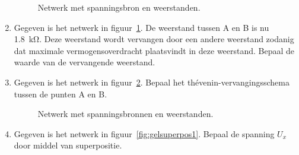 \begin{enumerate}[labelindent=0pt,labelwidth=\widthof{8.88.\ },label=\textbf{\thechapter.\arabic*.},leftmargin=!,ref=\thechapter.\arabic*]
\begin{figure}[!ht]
\centering
{}
\caption{Netwerk met spanningsbron en weerstanden.}
\label{fig:gelnetwerkvoortheveninanalysis2}
\end{figure}



\item
\label{que:gelthevenin2b}
Gegeven is het netwerk in figuur~\ref{fig:gelnetwerkvoortheveninanalysis2}. De weerstand tussen A en B is nu \SI{1.8}{\kilo\ohm}. Deze weerstand wordt vervangen door een andere weerstand zodanig dat maximale vermogensoverdracht plaatsvindt in deze weerstand. Bepaal de waarde van de vervangende weerstand.

\item
\label{que:gelthevenin4}
Gegeven is het netwerk in figuur~\ref{fig:gelthevenin4}. Bepaal het thévenin-vervangingsschema tussen de punten A en B.
\begin{figure}[!ht]
\centering
{}
\caption{Netwerk met spanningsbronnen en weerstanden.}
\label{fig:gelthevenin4}
\end{figure}


\item
\label{que:gelsuperpos1}
Gegeven is het netwerk in figuur~\ref{fig:gelsuperpos1}. Bepaal de spanning $U_x$ door middel van superpositie.


\end{enumerate}
